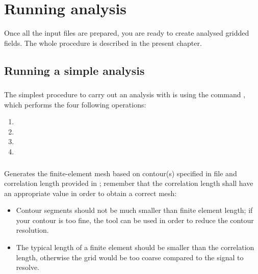 \chapter{Running analysis \label{chap:running}}

Once all the input files are prepared, you are ready to create analysed gridded fields. The whole procedure is described in the present chapter.

\minitoc

\section{Running a simple analysis}


\subsection{}

The simplest procedure to carry out an analysis with \diva is using the command , which performs the four following operations:

\begin{enumerate}
\item {}
\item {}
\item {}
\item {}
\end{enumerate}

\subsection{}

Generates the finite-element mesh based on contour(s) specified in file  and correlation length provided in ; remember that the correlation length shall have an appropriate value in order to obtain a correct mesh:
\begin{itemize}
\item Contour segments should not be much smaller than finite element length; if your contour is too fine, the tool  can be used in order to reduce the contour resolution.
\item The typical length of a finite element should be smaller than the correlation length, otherwise the grid would be too coarse compared to the signal to resolve.
\end{itemize}


